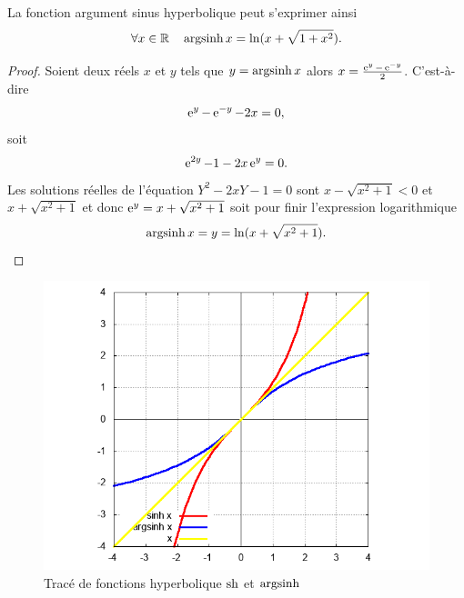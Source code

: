 %
\begin{prop}
La fonction argument sinus hyperbolique peut s'exprimer ainsi
 \begin{equation}
   \forall x \in \mathbb{R} \quad \operatorname{argsinh} x = \ln(x+\sqrt{1+x^2}).
 \end{equation}
\end{prop}
\begin{proof}
  Soient deux réels $x$ et $y$ tels que $y=\operatorname{argsinh} x$ alors $x=\frac{\operatorname{e}^y - \operatorname{e}^{-y}}{2}$. C'est-à-dire
  \begin{equation}
    \operatorname{e}^y - \operatorname{e}^{-y} -2x=0,
  \end{equation}
  soit
  \begin{equation}
    \operatorname{e}^{2y}-1-2x\operatorname{e}^{y}=0.
  \end{equation}
  Les solutions réelles de l'équation $Y^2-2xY-1=0$ sont $x-\sqrt{x^2+1}<0$ et $x+\sqrt{x^2+1}$ et donc $\operatorname{e}^y=x+\sqrt{x^2+1}$ soit pour finir l'expression logarithmique
  \begin{equation}
    \operatorname{argsinh} x = y = \ln(x+\sqrt{x^2+1}).
  \end{equation}
\end{proof}
%
\begin{figure}
  \centering
  \includegraphics[scale=0.4,angle=-90]{argsinh.png}
  \caption{Tracé de fonctions hyperbolique $\operatorname{sh}$ et $\operatorname{argsinh}$}
  \label{fig:tracesinhargsh}
\end{figure}
%
